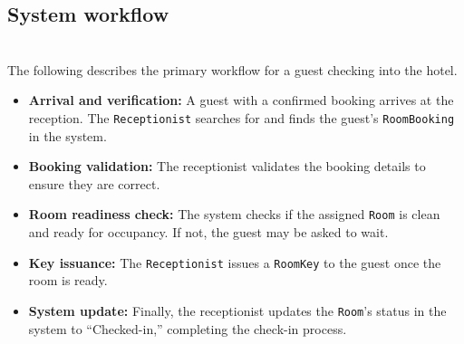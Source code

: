 \subsection{System workflow}\label{HtiiQc-GmcLSpqfhFXuoU}
\\
The following describes the primary workflow for a guest checking into the hotel.

\begin{itemize}
\item
\protect{}\label{XJAnC_u5d63uN1mGD9E0g}
\textbf{Arrival and verification:} A guest with a confirmed booking arrives at the reception. The \texttt{Receptionist} searches for and finds the guest's \texttt{RoomBooking} in the system.
\item
\protect{}\label{Vz59FvVK2ByoShhnpS_Ch}
\textbf{Booking validation:} The receptionist validates the booking details to ensure they are correct.
\item
\protect{}\label{XHb5_UhMffW61s7GCUlFU}
\textbf{Room readiness check:} The system checks if the assigned \texttt{Room} is clean and ready for occupancy. If not, the guest may be asked to wait.
\item
\protect{}\label{RU_MZ86El64YUssAhrZXc}
\textbf{Key issuance:} The \texttt{Receptionist} issues a \texttt{RoomKey} to the guest once the room is ready.
\item
\protect{}\label{N3tO8Qok12fOgRlg8zBL0}
\textbf{System update:} Finally, the receptionist updates the \texttt{Room}'s status in the system to ``Checked-in,'' completing the check-in process.
\end{itemize}

